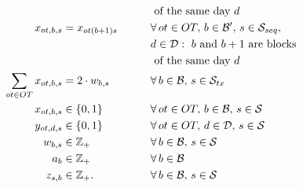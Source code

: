 \begin{alignat}{4}
    &                  &&       &                                                          &                 &\qquad & \text{ of the same day $d$}\label{eq:c7}\\
    &                  && \quad & x_{ot,b,s}       & = x_{ot(b+1)s}   &\qquad & \forall\, ot \in OT,\, b \in \mathcal{B}^{\prime},\,s \in \mathcal{S}_{seq},\, \nonumber\\
    &                  &&       &                                                          &                 &\qquad & d \in \mathcal{D} : \text{ $b$ and $b+1$ are blocks} \nonumber\\
    &                  &&       &                                                          &                 &\qquad & \text{ of the same day $d$}\label{eq:c8}\\
    &                  && \quad & \sum_{ot \in OT} x_{ot,b,s}   & = 2 \cdot w_{b,s}  & \qquad & \forall\, b \in \mathcal{B},\,s \in \mathcal{S}_{tx}  \label{eq:c9}\\
    &                  &&       & x_{ot,b,s}                           & \in \{0,1\}                 &        & \forall\, ot \in OT,\, b \in \mathcal{B},\, s \in \mathcal{S}\nonumber \\
    &                  &&       & y_{ot,d,s}                            & \in \{0,1\}                 &        & \forall\, ot \in OT,\, d \in \mathcal{D},\, s \in \mathcal{S}\nonumber \\
    &                  &&       & w_{b,s}                         & \in \mathbb{Z_{+}}          &        & \forall\, b \in \mathcal{B},\, s \in \mathcal{S}\nonumber\\
    &                  &&       & a_{b}                      & \in \mathbb{Z_{+}}          &        & \forall \, b \in \mathcal{B}\nonumber\\
    &                  &&       & z_{s,b}                       & \in \mathbb{Z_{+}}.          &        & \forall \, b \in \mathcal{B},\, s \in \mathcal{S} \nonumber
\end{alignat}

\bigskip

